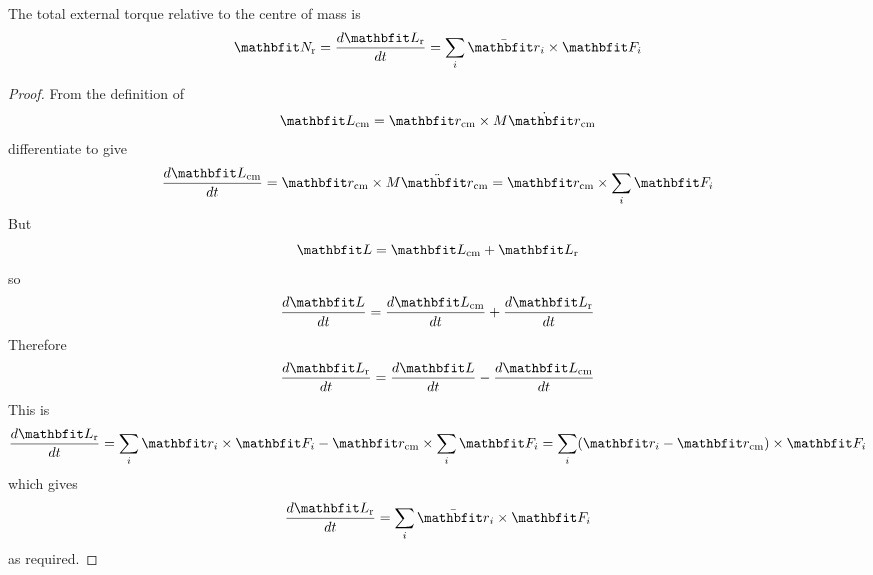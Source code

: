 \begin{theorem}
The total external torque relative to the centre of mass is
$$\vect{N}_{\rm r}=\der{\vect{L}_{\rm r}}{t}
=\sum_i \bar{\vect{r}}_i\times\vect{F}_i$$
\end{theorem}
\begin{proof}
From the definition of
$$\vect{L}_{\rm cm}=\vect{r}_{\rm cm}\times M\dot{\vect{r}}_{\rm cm}$$
differentiate to give
$$\der{\vect{L}_{\rm cm}}{t}
=\vect{r}_{\rm cm}\times M\ddot{\vect{r}}_{\rm cm}
=\vect{r}_{\rm cm}\times \sum_i\vect{F}_i$$
But
$$\vect{L}=\vect{L}_{\rm cm}+\vect{L}_{\rm r}$$
so
$$\der{\vect{L}}{t}=\der{\vect{L}_{\rm cm}}{t}+\der{\vect{L}_{\rm r}}{t}$$
Therefore
$$\der{\vect{L}_{\rm r}}{t}=\der{\vect{L}}{t}-\der{\vect{L}_{\rm cm}}{t}$$
This is
$$\der{\vect{L}_{\rm r}}{t}
=\sum_i\vect{r}_i\times\vect{F}_i-\vect{r}_{\rm cm}\times\sum_i\vect{F}_i
=\sum_i(\vect{r}_i-\vect{r}_{\rm cm})\times\vect{F}_i$$
which gives
$$\der{\vect{L}_{\rm r}}{t}=\sum_i \bar{\vect{r}}_i\times\vect{F}_i$$
as required.
\end{proof}
